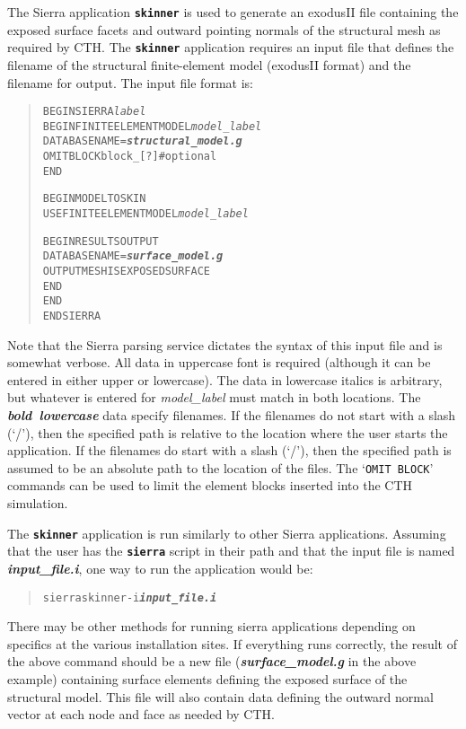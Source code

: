 \documentclass[11pt,twoside]{article}
\newcommand{\cmd}[1]
   {\mbox{\tt #1}\null}
\newcommand{\code}[1]
   {\mbox{\bf\tt #1}\null}
\newcommand{\file}[1]
   {\mbox{\bf\em #1}\null}
\newenvironment{source}
{\small\begin{quote}\begin{alltt}}
{\end{alltt}\end{quote}\normalsize}
\begin{document}
The Sierra application \code{skinner} is used to generate an exodusII
file containing the exposed surface facets and outward pointing normals
of the structural mesh as required by CTH.  The \code{skinner}
application requires an input file that defines the filename of the
structural finite{}-element model (exodusII format) and the filename
for output.  The input file format is:
\begin{source}
BEGIN SIERRA \textit{label}
BEGIN FINITE ELEMENT MODEL \textit{model\_label}
  DATABASE NAME = \file{structural\_model.g}
  OMIT BLOCK block\_[?]      # optional 
 END 

 BEGIN MODEL TO SKIN
  USE FINITE ELEMENT MODEL \textit{model\_label}

  BEGIN RESULTS OUTPUT
    DATABASE NAME = \file{surface\_model.g}
    OUTPUT MESH IS EXPOSED SURFACE
  END
END
END SIERRA
\end{source}
Note that the Sierra parsing service dictates the syntax of this input
file and is somewhat verbose.  All data in uppercase font is required
(although it can be entered in either upper or lowercase).  The data
in lowercase italics is arbitrary, but whatever is entered for
\textit{model\_label} must match in both locations.  The \file{bold
lowercase} data specify filenames.  If the filenames do not start with
a slash (`/'), then the specified path is relative to the location
where the user starts the application. If the filenames do start with a
slash (`/'), then the specified path is assumed to be an absolute path
to the location of the files.  The `\cmd{OMIT BLOCK}' commands can
be used to limit the element blocks inserted into the CTH simulation.


The \code{skinner} application is run similarly to other Sierra
applications.  Assuming that the user has the \code{sierra} script in their
path and that the input file is named \file{input\_file.i}, one way to
run the application would be:
\begin{source}
sierra skinner {-}i \file{input\_file.i}
\end{source}
There may be other methods for running sierra applications depending on
specifics at the various installation sites.  If everything runs
correctly, the result of the above command should be a new file
(\file{surface\_model.g} in the above example) containing surface
elements defining the exposed surface of the structural model. This
file will also contain data defining the outward normal vector at each
node and face as needed by CTH.
\end{document}
